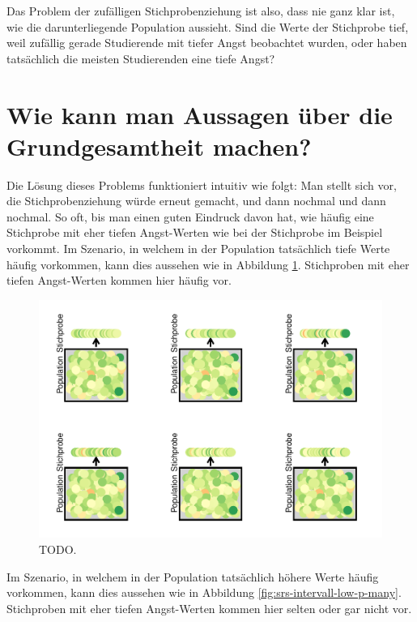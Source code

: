 \documentclass[
]{book}
\theoremstyle{definition}
\theoremstyle{definition}
\theoremstyle{definition}
\theoremstyle{definition}
\theoremstyle{remark}
\begin{document}
Das Problem der zufälligen Stichprobenziehung ist also, dass nie ganz klar ist, wie die darunterliegende Population aussieht. Sind die Werte der Stichprobe tief, weil zufällig gerade Studierende mit tiefer Angst beobachtet wurden, oder haben tatsächlich die meisten Studierenden eine tiefe Angst?

\section{Wie kann man Aussagen über die Grundgesamtheit machen?}\label{stichprobenziehung-loesung}

Die Lösung dieses Problems funktioniert intuitiv wie folgt: Man stellt sich vor, die Stichprobenziehung würde erneut gemacht, und dann nochmal und dann nochmal. So oft, bis man einen guten Eindruck davon hat, wie häufig eine Stichprobe mit eher tiefen Angst-Werten wie bei der Stichprobe im Beispiel vorkommt. Im Szenario, in welchem in der Population tatsächlich tiefe Werte häufig vorkommen, kann dies aussehen wie in Abbildung \ref{fig:srs-intervall-high-p-many}. Stichproben mit eher tiefen Angst-Werten kommen hier häufig vor.

\begin{figure}
\centering
\includegraphics{aps_statistik1_files/figure-latex/srs-intervall-high-p-many-1.pdf}
\caption{\label{fig:srs-intervall-high-p-many}TODO.}
\end{figure}

Im Szenario, in welchem in der Population tatsächlich höhere Werte häufig vorkommen, kann dies aussehen wie in Abbildung \ref{fig:srs-intervall-low-p-many}. Stichproben mit eher tiefen Angst-Werten kommen hier selten oder gar nicht vor.
\end{document}
